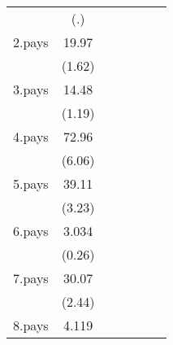 {\begin{tabular}{l*{6}{c}}
                    &         (.)         &                     &                     &                     &                     &                     \\
[1em]
2.pays              &       19.97         &                     &                     &                     &                     &                     \\
                    &      (1.62)         &                     &                     &                     &                     &                     \\
[1em]
3.pays              &       14.48         &                     &                     &                     &                     &                     \\
                    &      (1.19)         &                     &                     &                     &                     &                     \\
[1em]
4.pays              &       72.96\sym{***}&                     &                     &                     &                     &                     \\
                    &      (6.06)         &                     &                     &                     &                     &                     \\
[1em]
5.pays              &       39.11\sym{**} &                     &                     &                     &                     &                     \\
                    &      (3.23)         &                     &                     &                     &                     &                     \\
[1em]
6.pays              &       3.034         &                     &                     &                     &                     &                     \\
                    &      (0.26)         &                     &                     &                     &                     &                     \\
[1em]
7.pays              &       30.07\sym{*}  &                     &                     &                     &                     &                     \\
                    &      (2.44)         &                     &                     &                     &                     &                     \\
[1em]
8.pays              &       4.119         &                     &                     &                     &                     &                     \\

\end{tabular}}
